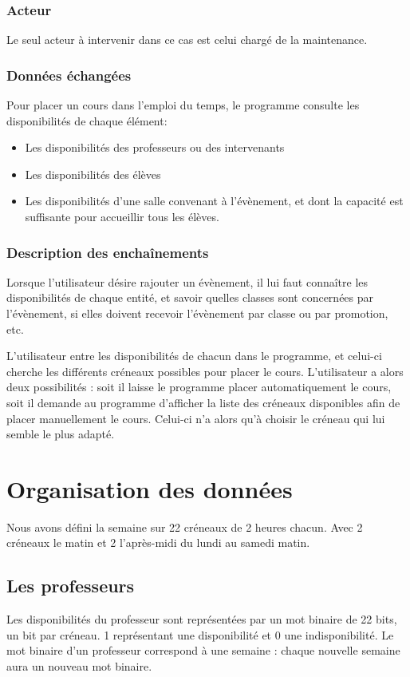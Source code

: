 \documentclass[12pt,a4paper,french]{article}
\newcounter{subsubsubsection}
\begin{document}
\subsubsection{Acteur}
Le seul acteur à intervenir dans ce cas est celui chargé de la maintenance.
            
\subsubsection{Données échangées}
Pour placer un cours dans l'emploi du temps, le programme consulte les disponibilités de chaque élément:

\begin{itemize}
\item Les disponibilités des professeurs ou des intervenants
\item Les disponibilités des élèves
\item Les disponibilités d'une salle convenant à l'évènement, et dont la capacité est suffisante pour accueillir tous les élèves.
\end{itemize}
                
\subsubsection{Description des enchaînements}        
Lorsque l'utilisateur désire rajouter un évènement, il lui faut connaître les disponibilités de chaque entité, et savoir quelles classes sont concernées par l'évènement, si elles doivent recevoir l'évènement par classe ou par promotion, etc.

L'utilisateur entre les disponibilités de chacun dans le programme, et celui-ci cherche les différents créneaux possibles pour placer le cours. L'utilisateur a alors deux possibilités : soit il laisse le programme placer automatiquement le cours, soit il demande au programme d'afficher la liste des créneaux disponibles afin de placer manuellement le cours. Celui-ci n'a alors qu'à choisir le créneau qui lui semble le plus adapté.

\newpage
\section{Organisation des données}
Nous avons défini la semaine sur 22 créneaux de 2 heures chacun. Avec 2 créneaux le matin et 2 l'après-midi du lundi au samedi matin.

\subsection{Les professeurs}
Les disponibilités du professeur sont représentées par un mot binaire de 22 bits, un bit par créneau. 1 représentant une disponibilité et 0 une indisponibilité.
Le mot binaire d'un professeur correspond à une semaine : chaque nouvelle semaine aura un nouveau mot binaire.
\end{document}
